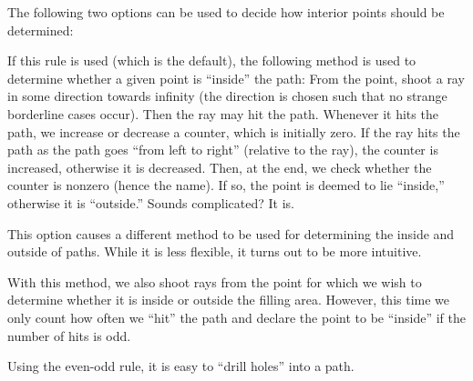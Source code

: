 The following two options can be used to decide how interior points
should be determined:
\begin{itemize}
  If this rule is used (which is the default), the following method is
  used to determine whether a given point is ``inside'' the path: From
  the point, shoot a ray in some direction towards infinity (the
  direction is chosen such that no strange borderline cases
  occur). Then the ray may hit the path. Whenever it hits the path, we
  increase or decrease a counter, which is initially zero. If the ray
  hits the path as the path goes ``from left to right'' (relative to
  the ray), the counter is increased, otherwise it is decreased. Then,
  at the end, we check whether the counter is nonzero (hence the
  name). If so, the point is deemed to lie ``inside,'' otherwise it is
  ``outside.'' Sounds complicated? It is.

\begin{codeexample}[]
\end{codeexample}

  This option causes a different method to be used for determining the
  inside and outside of paths. While it is less flexible, it turns out
  to be more intuitive.

  With this method, we also shoot rays from the point for which we
  wish to determine whether it is inside or outside the filling
  area. However, this time we only count how often we ``hit'' the path
  and declare the point to be ``inside'' if the number of hits is odd.

  Using the even-odd rule, it is easy to ``drill holes'' into a path.
  
\begin{codeexample}[]
\end{codeexample}
\end{itemize}
